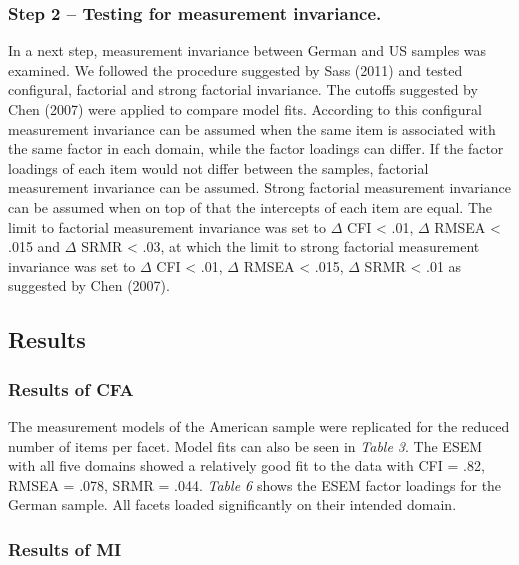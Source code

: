 \documentclass[,man,floatsintext]{apa6}
\begin{document}
\subsubsection{Step 2 -- Testing for measurement
invariance.}\label{step-2-testing-for-measurement-invariance.}

In a next step, measurement invariance between German and US samples was
examined. We followed the procedure suggested by Sass (2011) and tested
configural, factorial and strong factorial invariance. The cutoffs
suggested by Chen (2007) were applied to compare model fits. According
to this configural measurement invariance can be assumed when the same
item is associated with the same factor in each domain, while the factor
loadings can differ. If the factor loadings of each item would not
differ between the samples, factorial measurement invariance can be
assumed. Strong factorial measurement invariance can be assumed when on
top of that the intercepts of each item are equal. The limit to
factorial measurement invariance was set to \(\Delta\) CFI \textless{}
.01, \(\Delta\) RMSEA \textless{} .015 and \(\Delta\) SRMR \textless{}
.03, at which the limit to strong factorial measurement invariance was
set to \(\Delta\) CFI \textless{} .01, \(\Delta\) RMSEA \textless{}
.015, \(\Delta\) SRMR \textless{} .01 as suggested by Chen (2007).

\subsection{Results}\label{results-1}

\subsubsection{Results of CFA}\label{results-of-cfa}

The measurement models of the American sample were replicated for the
reduced number of items per facet. Model fits can also be seen in
\emph{Table 3}. The ESEM with all five domains showed a relatively good
fit to the data with CFI = .82, RMSEA = .078, SRMR = .044. \emph{Table
6} shows the ESEM factor loadings for the German sample. All facets
loaded significantly on their intended domain.

\vspace{5mm}

\vspace{5mm}

\subsubsection{Results of MI}\label{results-of-mi}
\end{document}
